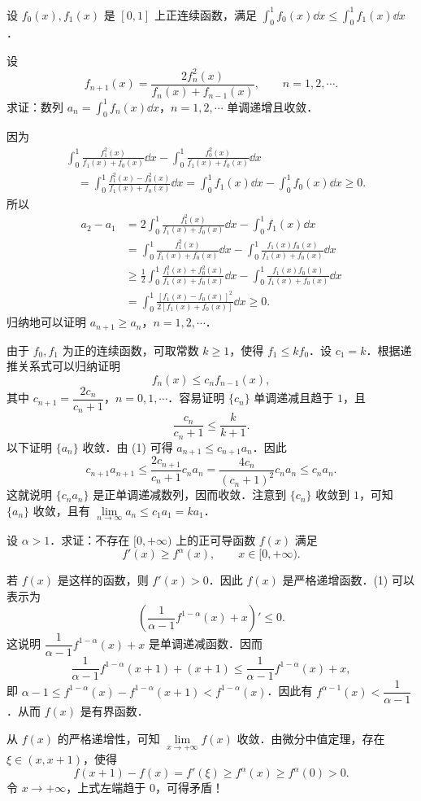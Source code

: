 设 $f_0(x),f_1(x)$ 是 $[0,1]$ 上正连续函数，满足 $\displaystyle\int_0^1 f_0(x)\dd x\le\int_0^1 f_1(x)\dd x$．

设
\[
  f_{n+1}(x)=\frac{2f_n^2(x)}{f_n(x)+f_{n-1}(x)},\qquad n=1,2,\cdots.
\]
求证：数列 $\displaystyle a_n=\int_0^1 f_n(x)\dd x$，$n=1,2,\cdots$ 单调递增且收敛．
\begin{solution}
因为
\begin{align*}
  &\int_0^1\frac{f_1^2(x)}{f_1(x)+f_0(x)}\dd x-\int_0^1\frac{f_0^2(x)}{f_1(x)+f_0(x)}\dd x\\
  &\quad=\int_0^1\frac{f_1^2(x)-f_0^2(x)}{f_1(x)+f_0(x)}\dd x
  =\int_0^1 f_1(x)\dd x-\int_0^1 f_0(x)\dd x\ge 0.
\end{align*}
所以
\begin{align*}
  a_2-a_1&=2\int_0^1\frac{f_1^2(x)}{f_1(x)+f_0(x)}\dd x-\int_0^1 f_1(x)\dd x\\
  &=\int_0^1\frac{f_1^2(x)}{f_1(x)+f_0(x)}\dd x-\int_0^1\frac{f_1(x)f_0(x)}{f_1(x)+f_0(x)}\dd x\\
  &\ge\frac{1}{2}\int_0^1\frac{f_1^2(x)+f_0^2(x)}{f_1(x)+f_0(x)}\dd x-\int_0^1\frac{f_1(x)f_0(x)}{f_1(x)+f_0(x)}\dd x\\
  &=\int_0^1\frac{\left[f_1(x)-f_0(x)\right]^2}{2\left[f_1(x)+f_0(x)\right]}\dd x\ge 0.
\end{align*}
归纳地可以证明 $a_{n+1}\ge a_n$，$n=1,2,\cdots$．

由于 $f_0,f_1$ 为正的连续函数，可取常数 $k\ge 1$，使得 $f_1\le kf_0$．设 $c_1=k$．根据递推关系式可以归纳证明
\begin{equation}
  f_n(x)\le c_nf_{n-1}(x),\tag{1}
\end{equation}
其中 $c_{n+1}=\dfrac{2c_n}{c_n+1}$，$n=0,1,\cdots$．容易证明 $\{c_n\}$ 单调递减且趋于 $1$，且
\[
  \frac{c_n}{c_n+1}\le\frac{k}{k+1}.
\]
以下证明 $\{a_n\}$ 收敛．由 (1) 可得 $a_{n+1}\le c_{n+1}a_n$．因此
\[
  c_{n+1}a_{n+1}\le\frac{2c_{n+1}}{c_n+1}c_na_n
  =\frac{4c_n}{(c_n+1)^2}c_na_n\le c_na_n.
\]
这就说明 $\{c_na_n\}$ 是正单调递减数列，因而收敛．注意到 $\{c_n\}$ 收敛到 $1$，可知 $\{a_n\}$ 收敛，且有 $\lim\limits_{n\to\infty}a_n\le c_1a_1=ka_1$．
\end{solution}

设 $\alpha>1$．求证：不存在 $[0,+\infty)$ 上的正可导函数 $f(x)$ 满足
\begin{equation}
  f'(x)\ge f^{\alpha}(x),\qquad x\in[0,+\infty).\tag{1}
\end{equation}
\begin{solution}
若 $f(x)$ 是这样的函数，则 $f'(x)>0$．因此 $f(x)$ 是严格递增函数．(1) 可以表示为
\[
  \left(\frac{1}{\alpha-1}f^{1-\alpha}(x)+x\right)'\le 0.
\]
这说明 $\dfrac{1}{\alpha-1}f^{1-\alpha}(x)+x$ 是单调递减函数．因而
\[
  \frac{1}{\alpha-1}f^{1-\alpha}(x+1)+(x+1)\le\frac{1}{\alpha-1}f^{1-\alpha}(x)+x,
\]
即 $\alpha-1\le f^{1-\alpha}(x)-f^{1-\alpha}(x+1)<f^{1-\alpha}(x)$．因此有 $f^{\alpha-1}(x)<\dfrac{1}{\alpha-1}$．从而 $f(x)$ 是有界函数．

从 $f(x)$ 的严格递增性，可知 $\lim\limits_{x\to+\infty}f(x)$ 收敛．由微分中值定理，存在 $\xi\in(x,x+1)$，使得
\[
  f(x+1)-f(x)=f'(\xi)\ge f^{\alpha}(x)\ge f^{\alpha}(0)>0.
\]
令 $x\to+\infty$，上式左端趋于 $0$，可得矛盾！
\end{solution}

